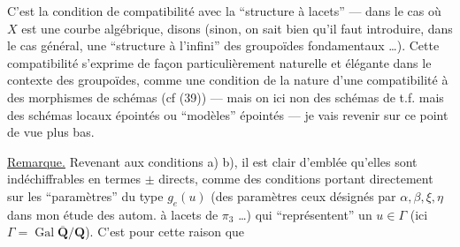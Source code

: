 C'est la condition de compatibilité avec la ``structure à lacets'' --- dans le cas où $X$ est une courbe algébrique, disons (sinon, on sait bien qu'il faut introduire, dans le cas général, une ``structure à l'infini'' des groupoïdes fondamentaux \ldots). \margin{$\Vert$} Cette compatibilité  s'exprime de façon particulièrement naturelle et élégante dans le contexte des groupoïdes, \unsure{$\{$} comme une condition de la nature d'une compatibilité à des morphismes de schémas (cf (39)) --- mais on  ici non des schémas de t.f. mais des schémas locaux épointés ou ``modèles'' épointés --- je vais revenir sur ce point de vue plus bas.

\uline{Remarque.} Revenant aux conditions a) b), il est clair d'emblée qu'elles sont indéchiffrables  en termes $\pm$ directs, comme des conditions portant directement sur les ``paramètres'' du type $g_e(u)$ (des paramètres   ceux désignés par $\alpha,\beta,\xi,\eta$ dans mon étude des autom. à lacets de $\pi_3$ \ldots) qui ``représentent'' un $u\in\Gamma$ (ici $\Gamma=\operatorname{Gal}\overline{\mathbf{Q}}/\mathbf{Q}$).  C'est pour cette raison que 
